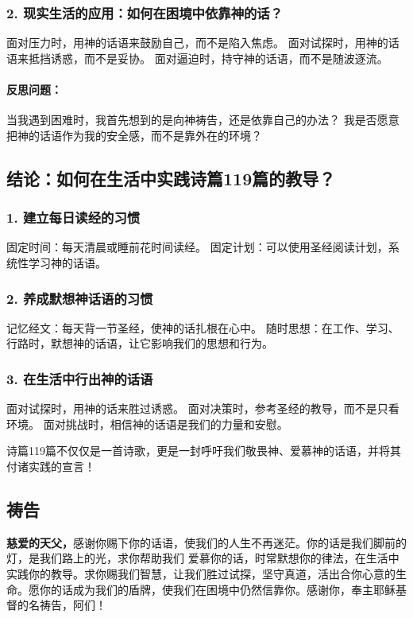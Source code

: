 \documentclass[a4paper, 12pt]{article}
\begin{document}
\subsubsection*{2. 现实生活的应用：如何在困境中依靠神的话？}
面对压力时，用神的话语来鼓励自己，而不是陷入焦虑。
面对试探时，用神的话语来抵挡诱惑，而不是妥协。
面对逼迫时，持守神的话语，而不是随波逐流。
\paragraph*{反思问题：}

当我遇到困难时，我首先想到的是向神祷告，还是依靠自己的办法？
我是否愿意把神的话语作为我的安全感，而不是靠外在的环境？
\subsection*{结论：如何在生活中实践诗篇119篇的教导？}
\subsubsection*{1. 建立每日读经的习惯}
固定时间：每天清晨或睡前花时间读经。
固定计划：可以使用圣经阅读计划，系统性学习神的话语。
\subsubsection*{2. 养成默想神话语的习惯}
记忆经文：每天背一节圣经，使神的话扎根在心中。
随时思想：在工作、学习、行路时，默想神的话语，让它影响我们的思想和行为。
\subsubsection*{3. 在生活中行出神的话语}
面对试探时，用神的话来胜过诱惑。
面对决策时，参考圣经的教导，而不是只看环境。
面对挑战时，相信神的话语是我们的力量和安慰。

诗篇119篇不仅仅是一首诗歌，更是一封呼吁我们敬畏神、爱慕神的话语，并将其付诸实践的宣言！

\subsection*{祷告}
\textbf{慈爱的天父，}感谢你赐下你的话语，使我们的人生不再迷茫。你的话是我们脚前的灯，是我们路上的光，求你帮助我们
爱慕你的话，时常默想你的律法，在生活中实践你的教导。求你赐我们智慧，让我们胜过试探，坚守真道，活出合你心意的生命。愿你的话成为我们的盾牌，使我们在困境中仍然信靠你。感谢你，奉主耶稣基督的名祷告，阿们！
\newpage
\end{document}
